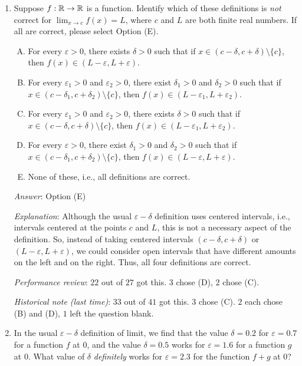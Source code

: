 \documentclass[10pt]{amsart}
\begin{document}
\begin{enumerate}
\item Suppose $f:\mathbb{R} \to \mathbb{R}$ is a function. Identify which of these
  definitions is {\em not} correct for $\displaystyle \lim_{x \to c}
  f(x) = L$, where $c$ and $L$ are both finite real numbers. If all
  are correct, please select Option (E).

  \begin{enumerate}[(A)]
  \item For every $\varepsilon > 0$, there exists $\delta > 0$ such
    that if $x \in (c - \delta, c + \delta) \setminus \{ c \}$, then
    $f(x) \in (L - \varepsilon, L + \varepsilon)$.
  \item For every $\varepsilon_1 > 0$ and $\varepsilon_2 > 0$, there exist
    $\delta_1 > 0$ and $\delta_2 > 0$ such that if $x \in (c -
    \delta_1,c+\delta_2)\setminus \{ c \}$, then $f(x) \in (L -
    \varepsilon_1, L + \varepsilon_2)$.
  \item For every $\varepsilon_1 > 0$ and $\varepsilon_2 > 0$, there exists
    $\delta > 0$ such that if $x \in (c - \delta, c + \delta)
    \setminus \{ c \}$, then $f(x) \in (L - \varepsilon_1, L + \varepsilon_2)$.
  \item For every $\varepsilon > 0$, there exist $\delta_1 > 0$ and
    $\delta_2 > 0$ such that if $x \in (c - \delta_1, c + \delta_2)
    \setminus \{ c \}$, then $f(x) \in (L - \varepsilon, L + \varepsilon)$.
  \item None of these, i.e., all definitions are correct.
  \end{enumerate}

  {\em Answer}: Option (E)

  {\em Explanation}: Although the usual $\varepsilon-\delta$ definition
  uses centered intervals, i.e., intervals centered at the points $c$
  and $L$, this is not a necessary aspect of the definition. So,
  instead of taking centered intervals $(c - \delta, c + \delta)$ or
  $(L - \varepsilon,L + \varepsilon)$, we could consider open intervals that
  have different amounts on the left and on the right. Thus, all four
  definitions are correct.

  {\em Performance review}: $22$ out of $27$ got this. $3$ chose (D),
  $2$ chose (C).

  {\em Historical note (last time)}: $33$ out of $41$ got this. $3$ chose
  (C). $2$ each chose (B) and (D), $1$ left the question blank.


\item In the usual $\varepsilon-\delta$ definition of limit, we find that
  the value $\delta = 0.2$ for $\varepsilon = 0.7$ for a function $f$ at
  $0$, and the value $\delta = 0.5$ works for $\varepsilon = 1.6$ for a
  function $g$ at $0$. What value of $\delta$ {\em definitely} works
  for $\varepsilon = 2.3$ for the function $f + g$ at $0$?


\end{enumerate}
\end{document}
